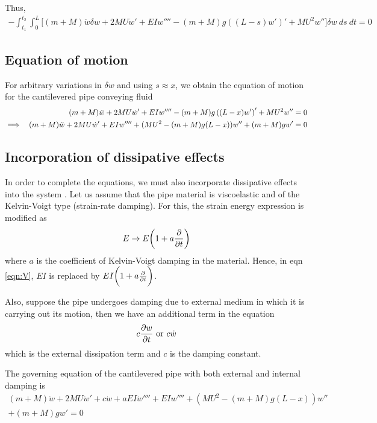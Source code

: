 \documentclass[12pt]{report}
\begin{document}
Thus,
\begin{multline*}
-\int_{t_1}^{t_2} \int_0^L \bigg[(m + M) \ddot{w}\delta w + 2MU\dot{w}' + EI w'''' - (m + M)g ((L - s) w')' + MU^2 w''\bigg]\delta w~ds~dt = 0 
\end{multline*}

\subsection{Equation of motion}
For arbitrary variations in $\delta w$ and using $s \approx x$, we obtain the equation of motion for the cantilevered pipe conveying fluid
\begin{align}
(m + M) \ddot{w} + 2MU \dot{w}' + EI w'''' - (m + M)g\left((L - x)w'\right)' + MU^2w'' &= 0 \notag \\
\implies ~~(m + M) \ddot{w} + 2MU \dot{w}' + EI w''''  + (MU^2- (m + M)g(L - x))w'' + (m + M)gw' &= 0  \label{eqn:linear-cantilevered-pipe}
\end{align}

\subsection{Incorporation of dissipative effects}
In order to complete the equations, we must also incorporate dissipative effects into the system \cite{paidoussis}. Let us assume that the pipe material is viscoelastic and of the Kelvin-Voigt type (strain-rate damping). For this, the strain energy expression is modified as 
\begin{align}
E \rightarrow E\bigg(1 + a\pdv{}{t}\bigg) \label{eqn:linear-dissipation-effect}
\end{align} 
where $a$ is the coefficient of Kelvin-Voigt damping in the material. Hence, in eqn \ref{eqn:V}, $EI$ is replaced by $EI\bigg(1 + a\pdv{}{t}\bigg)$. 

Also, suppose the pipe undergoes damping due to external medium in which it is carrying out its motion, then we have an additional term in the equation
$$c\pdv{w}{t} \text{ or  } c\dot{w}$$
which is the external dissipation term and $c$ is the damping constant.

\begin{mdframed}
The governing equation of the cantilevered pipe with both external and internal damping is \cite{paidoussis1974} 
\begin{multline}
(m + M) \ddot{w} + 2MU \dot{w}' + c\dot{w} +  aEI \dot{w}'''' + EI w'''' + (MU^2- (m + M)g(L - x))w'' \\ + (m + M)gw' = 0  \label{eqn:linear-cantilevered-pipe-dissipation}
\end{multline}
\end{mdframed}
\end{document}
